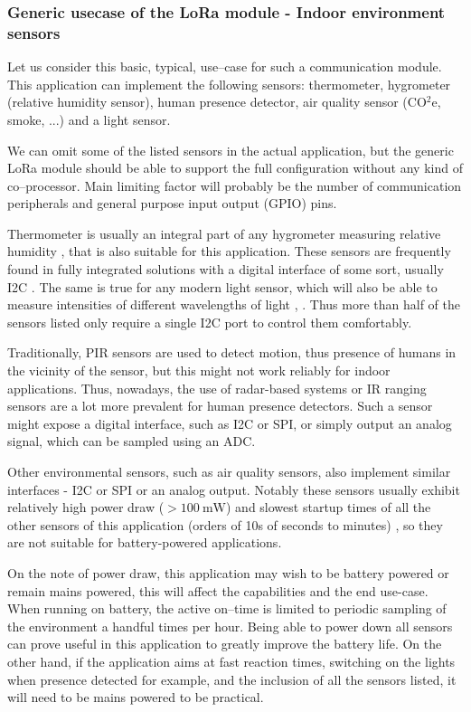 \subsubsection{Generic usecase of the LoRa module - Indoor environment sensors}
Let us consider this basic, typical, use--case for such a communication module. This application can implement the following sensors: thermometer, hygrometer (relative humidity sensor), human presence detector, air quality sensor (CO$^2$e, smoke, ...) and a light sensor.

We can omit some of the listed sensors in the actual application, but the generic LoRa module should be able to support the full configuration without any kind of co--processor. Main limiting factor will probably be the number of communication peripherals and general purpose input output (GPIO) pins.

Thermometer is usually an integral part of any hygrometer measuring relative humidity \cite{webster_humidity_1998}, that is also suitable for this application. These sensors are frequently found in fully integrated solutions with a digital interface of some sort, usually I2C \cite{bosch_sensortec_gmbh_bst-bme280-ds002pdf_2024}. The same is true for any modern light sensor, which will also be able to measure intensities of different wavelengths of light \cite{stmicroelectronics_ambient_2024}, \cite{texas_instruments_inc_light_2024}. Thus more than half of the sensors listed only require a single I2C port to control them comfortably.

Traditionally, PIR sensors are used to detect motion, thus presence of humans in the vicinity of the sensor, but this might not work reliably for indoor applications. Thus, nowadays, the use of radar-based systems \cite{infineon_technologies_presence_2024} or IR ranging sensors \cite{stmicroelectronics_human_2024} are a lot more prevalent for human presence detectors. Such a sensor might expose a digital interface, such as I2C or SPI, or simply output an analog signal, which can be sampled using an ADC.

Other environmental sensors, such as air quality sensors, also implement similar interfaces - I2C or SPI or an analog output. Notably these sensors usually exhibit relatively high power draw ($>100~\mathrm{mW}$) and slowest startup times of all the other sensors of this application (orders of 10s of seconds to minutes) \cite{amphenol_inc_mics-vz-89te_2024}, so they are not suitable for battery-powered applications.

On the note of power draw, this application may wish to be battery powered or remain mains powered, this will affect the capabilities and the end use-case. When running on battery, the active on--time is limited to periodic sampling of the environment a handful times per hour. Being able to power down all sensors can prove useful in this application to greatly improve the battery life. On the other hand, if the application aims at fast reaction times, switching on the lights when presence detected for example, and the inclusion of all the sensors listed, it will need to be mains powered to be practical.

